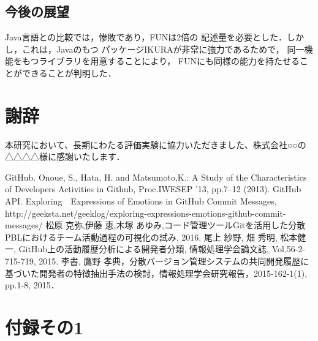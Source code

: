 \documentclass{funthesis}
\begin{document}
\section{今後の展望}

Java言語との比較では，惨敗であり，FUNは2倍の
記述量を必要とした．しかし，これは，Javaのもつ
パッケージIKURAが非常に強力であるためで，
同一機能をもつライブラリを用意することにより，
FUNにも同様の能力を持たせることができることが判明した．


\chapter*{謝辞}

本研究において、長期にわたる評価実験に協力いただきました、株式会社○○の△△△△様に感謝いたします．


\begin{thebibliography}{20}
  GitHub.
  Onoue, S., Hata, H. and Matsumoto,K.: A Study of the Characteristics of Developers Activities in Github, Proc.IWESEP ’13, pp.7–12 (2013).
  GitHub API.
 Exploring　Expressions of Emotions in GitHub Commit Messages,
\\ http://geeksta.net/geeklog/exploring-expressions-emotions-github-commit-messages/
  松原 克弥,伊藤 恵,木塚 あゆみ,コード管理ツールGitを活用した分散PBLにおけるチーム活動過程の可視化の試み, 2016.
  尾上 紗野, 畑 秀明, 松本健一, GitHub上の活動履歴分析による開発者分類, 情報処理学会論文誌, Vol.56-2-715-719, 2015.
 李書, 鷹野 孝典，分散バージョン管理システムの共同開発履歴に基づいた開発者の特徴抽出手法の検討，情報処理学会研究報告，2015-162-1(1), pp.1-8, 2015．
\end{thebibliography}


\appendix

\chapter*{付録その1} %
\end{document}
